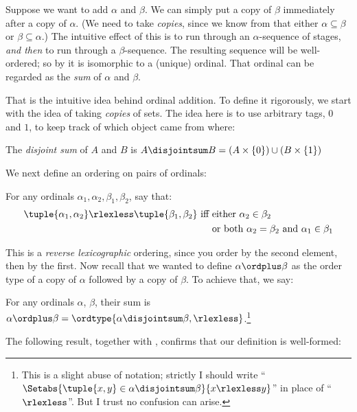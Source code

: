 \documentclass[../../../include/open-logic-section]{subfiles}
\begin{document}
Suppose we want to add $\alpha$ and $\beta$. We can simply put a {copy} of $\beta$ immediately after a copy of $\alpha$. (We need to take \emph{copies}, since we know from  that either $\alpha \subseteq \beta$ or $\beta \subseteq \alpha$.) The intuitive effect of this is to run through an $\alpha$-sequence of stages, \emph{and then} to run through a $\beta$-sequence. The resulting sequence will be well-ordered; so by  it is isomorphic to a (unique) ordinal. That ordinal can be regarded as the \emph{sum} of $\alpha$ and $\beta$. 

That is the intuitive idea behind ordinal addition. To define it rigorously, we start with the idea of taking \emph{copies} of sets. The idea here is to use arbitrary tags, $0$ and $1$, to keep track of which object came from where:
\begin{defn}The \emph{disjoint sum} of $A$ and $B$ is $A \disjointsum B = (A\times \{0\}) \cup (B \times \{1\})$
\end{defn}\noindent
We next define an ordering on pairs of ordinals:
\begin{defn}
	For any ordinals $\alpha_1, \alpha_2, \beta_1, \beta_2$, say that:
	\begin{align*}
		\tuple{\alpha_1, \alpha_2} \rlexless \tuple{\beta_1, \beta_2}\text{ iff }& \text{either }\alpha_2 \in \beta_2\\
		& \text{or both }\alpha_2 = \beta_2\text{ and }\alpha_1 \in \beta_1
	\end{align*} 
\end{defn}\noindent 
This is a \emph{reverse lexicographic} ordering, since you order by the second element, then by the first. Now recall that we wanted to define $\alpha \ordplus \beta$ as the order type of a copy of $\alpha$ followed by a copy of $\beta$. To achieve that, we say:
\begin{defn}
	For any ordinals $\alpha$, $\beta$, their sum is $\alpha \ordplus \beta = \ordtype{\alpha \disjointsum \beta, \rlexless}$.\footnote{This is a slight abuse of notation; strictly I should write ``$\Setabs{\tuple{x,y}\in \alpha\disjointsum\beta}{x \rlexless y}$'' in place of ``$\rlexless$''. But I trust no confusion can arise.}
\end{defn}\noindent
The following result, together with , confirms that our definition is well-formed:
\end{document}
